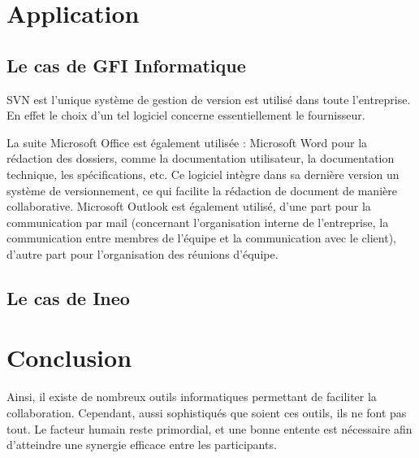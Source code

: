 \section{Application}

\subsection{Le cas de GFI Informatique}

SVN est l'unique système de gestion de version est utilisé dans toute l'entreprise. En effet le choix d'un tel logiciel concerne essentiellement le fournisseur.

La suite Microsoft Office est également utilisée :
Microsoft Word pour la rédaction des dossiers, comme la documentation utilisateur, la documentation technique, les spécifications, etc. Ce logiciel intègre dans sa dernière version un système de versionnement, ce qui facilite la rédaction de document de manière collaborative.
Microsoft Outlook est également utilisé, d'une part pour la communication par mail (concernant l'organisation interne de l'entreprise, la communication entre membres de l'équipe et la communication avec le client), d'autre part pour l'organisation des réunions d'équipe.

\subsection{Le cas de Ineo}

\section{Conclusion}

Ainsi, il existe de nombreux outils informatiques permettant de faciliter la collaboration. Cependant, aussi sophistiqués que soient ces outils, ils ne font pas tout. Le facteur humain reste primordial, et une bonne entente est nécessaire afin d’atteindre une synergie efficace entre les participants.
